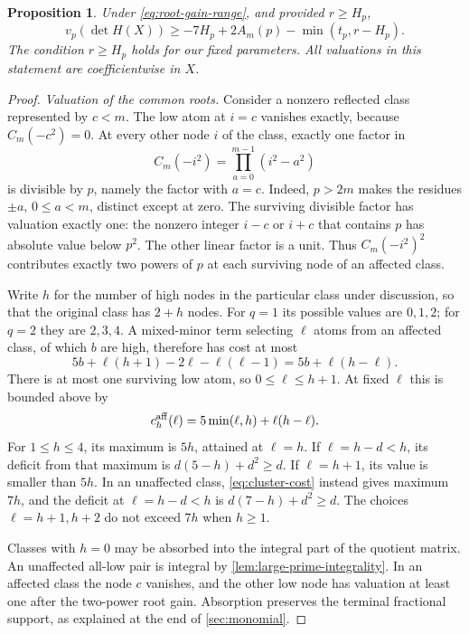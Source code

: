\documentclass[11pt,letterpaper]{article}
\newtheorem{proposition}[proposition]{Proposition}
\theoremstyle{definition}
\begin{document}
\begin{proposition}\label{prop:root-gain}
Under \eqref{eq:root-gain-range}, and provided $r\ge H_p$,
\begin{equation}\label{eq:root-gain-bound}
 v_p(\det H(X))\ge
 -7H_p+2A_m(p)-\min(t_p,r-H_p).
\end{equation}
The condition $r\ge H_p$ holds for our fixed parameters.
All valuations in this statement are coefficientwise in $X$.
\end{proposition}
\begin{proof}
\emph{Valuation of the common roots.}
Consider a nonzero reflected class represented by $c<m$.
The low atom at $i=c$ vanishes exactly, because $C_m(-c^2)=0$.
At every other node $i$ of the class, exactly one factor in
\[
 C_m(-i^2)=\prod_{a=0}^{m-1}(i^2-a^2)
\]
is divisible by $p$, namely the factor with $a=c$.
Indeed, $p>2m$ makes the residues $\pm a$, $0\le a<m$,
distinct except at zero. The surviving divisible factor has valuation
exactly one: the nonzero integer $i-c$ or $i+c$ that contains $p$
has absolute value below $p^2$. The other linear factor is a unit.
Thus $C_m(-i^2)^2$ contributes exactly two powers of $p$ at each
surviving node of an affected class.

Write $h$ for the number of high nodes in the particular class under
discussion, so that the original class has $2+h$ nodes.
For $q=1$ its possible values are $0,1,2$; for $q=2$ they are
$2,3,4$. A mixed-minor term selecting $\ell$ atoms from an affected
class, of which $b$ are high, therefore has cost at most
\begin{equation}\label{eq:affected-cluster-cost}
 5b+\ell(h+1)-2\ell-\ell(\ell-1)
 =5b+\ell(h-\ell).
\end{equation}
There is at most one surviving low atom, so $0\le\ell\le h+1$.
At fixed $\ell$ this is bounded above by
\[
 c_h^{\rm aff}(\ell)=5\min(\ell,h)+\ell(h-\ell).
\]
For $1\le h\le4$, its maximum is $5h$, attained at $\ell=h$.
If $\ell=h-d<h$, its deficit from that maximum is
$d(5-h)+d^2\ge d$. If $\ell=h+1$, its value is smaller than
$5h$. In an unaffected class, \eqref{eq:cluster-cost} instead gives
maximum $7h$, and the deficit at $\ell=h-d<h$ is
$d(7-h)+d^2\ge d$. The choices $\ell=h+1,h+2$ do not exceed
$7h$ when $h\ge1$.

Classes with $h=0$ may be absorbed into the integral part of the
quotient matrix. An unaffected all-low pair is integral by
\cref{lem:large-prime-integrality}. In an affected class the node
$c$ vanishes, and the other low node has valuation at least one
after the two-power root gain. Absorption preserves the terminal
fractional support, as explained at the end of \cref{sec:monomial}.


\end{proof}
\end{document}
